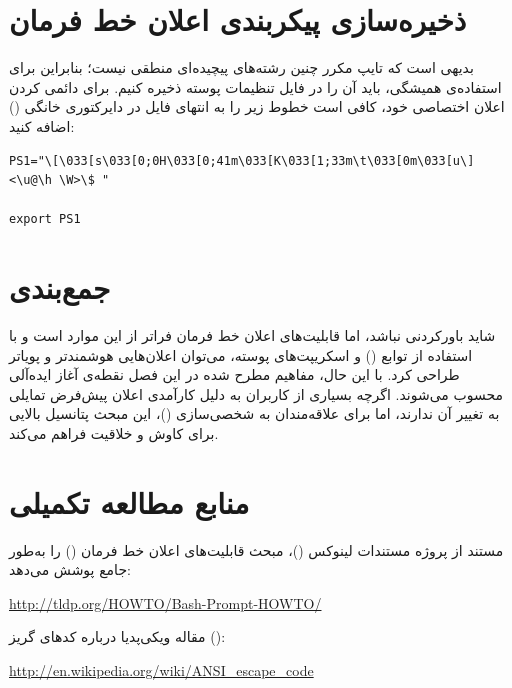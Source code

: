 \section{ذخیره‌سازی پیکربندی اعلان خط فرمان}

بدیهی است که تایپ مکرر چنین رشته‌های پیچیده‌ای منطقی نیست؛ بنابراین برای استفاده‌ی همیشگی، باید آن را در فایل تنظیمات پوسته ذخیره کنیم. برای دائمی کردن اعلان اختصاصی خود، کافی است خطوط زیر را به انتهای فایل  در دایرکتوری خانگی () اضافه کنید:

\begin{latin}
\begin{lstlisting}
PS1="\[\033[s\033[0;0H\033[0;41m\033[K\033[1;33m\t\033[0m\033[u\]<\u@\h \W>\$ "

export PS1
\end{lstlisting}
\end{latin}

\section{جمع‌بندی}

شاید باورکردنی نباشد، اما قابلیت‌های اعلان خط فرمان فراتر از این موارد است و با استفاده از توابع () و اسکریپت‌های پوسته، می‌توان اعلان‌هایی هوشمندتر و پویاتر طراحی کرد. با این حال، مفاهیم مطرح شده در این فصل نقطه‌ی آغاز ایده‌آلی محسوب می‌شوند. اگرچه بسیاری از کاربران به دلیل کارآمدی اعلان پیش‌فرض تمایلی به تغییر آن ندارند، اما برای علاقه‌مندان به شخصی‌سازی ()، این مبحث پتانسیل بالایی برای کاوش و خلاقیت فراهم می‌کند.

\section{منابع مطالعه تکمیلی}

مستند  از پروژه مستندات لینوکس ()، مبحث قابلیت‌های اعلان خط فرمان () را به‌طور جامع پوشش می‌دهد:

\begin{latin}
\url{http://tldp.org/HOWTO/Bash-Prompt-HOWTO/}
\end{latin}

مقاله ویکی‌پدیا درباره کدهای گریز  ():

\begin{latin}
\url{http://en.wikipedia.org/wiki/ANSI_escape_code}
\end{latin}